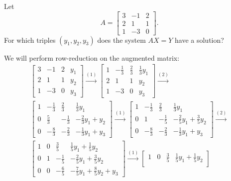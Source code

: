  Let
\begin{equation*}
  A =
  \begin{bmatrix}
    3 & -1 & 2 \\
    2 & 1 & 1 \\
    1 & -3 & 0
  \end{bmatrix}.
\end{equation*}
For which triples $(y_1, y_2, y_3)$ does the system $AX = Y$ have a
solution?
\begin{solution}
  We will perform row-reduction on the augmented matrix:
  \begin{gather*}
    \begin{bmatrix}
      3 & -1 & 2 & y_1 \\
      2 & 1 & 1 & y_2 \\
      1 & -3 & 0 & y_3
    \end{bmatrix}
    \xrightarrow{(1)}
    \begin{bmatrix}
      1 & -\frac13 & \frac23 & \frac13y_1 \\[3pt]
      2 & 1 & 1 & y_2 \\[3pt]
      1 & -3 & 0 & y_3
    \end{bmatrix}
    \xrightarrow{(2)} \\
    \begin{bmatrix}
      1 & -\frac13 & \frac23 & \frac13y_1 \\[3pt]
      0 & \frac53 & -\frac13 & -\frac23y_1 + y_2 \\[3pt]
      0 & -\frac83 & -\frac23 & -\frac13y_1 + y_3
    \end{bmatrix}
    \xrightarrow{(1)}
    \begin{bmatrix}
      1 & -\frac13 & \frac23 & \frac13y_1 \\[3pt]
      0 & 1 & -\frac15 & -\frac25y_1 + \frac35y_2 \\[3pt]
      0 & -\frac83 & -\frac23 & -\frac13y_1 + y_3
    \end{bmatrix}
    \xrightarrow{(2)} \\
    \begin{bmatrix}
      1 & 0 & \frac35 & \frac15y_1 + \frac15y_2 \\[3pt]
      0 & 1 & -\frac15 & -\frac25y_1 + \frac35y_2 \\[3pt]
      0 & 0 & -\frac65 & -\frac75y_1 + \frac85y_2 + y_3
    \end{bmatrix}
    \xrightarrow{(1)}
    \begin{bmatrix}
      1 & 0 & \frac35 & \frac15y_1 + \frac15y_2 \\[3pt]

\end{bmatrix}
\end{gather*}
\end{solution}
